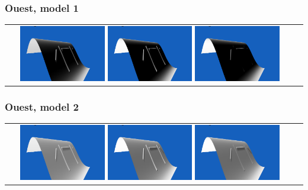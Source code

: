 \documentclass[a4paper]{article}
\begin{document}
\subsubsection{Ouest, model 1}
\begin{tabular}{cc}
\includegraphics[width=0.3\textwidth]{Images/Essais/Essai_8_phong_West_0.png}
\includegraphics[width=0.3\textwidth]{Images/Essais/Essai_8_slint_West_0.png}
\includegraphics[width=0.3\textwidth]{Images/Essais/Essai_9_slint_West_0.png}

\end{tabular}
\subsubsection{Ouest, model 2}
\begin{tabular}{cc}
\includegraphics[width=0.3\textwidth]{Images/Essais/Essai_8_phong_West_1.png}
\includegraphics[width=0.3\textwidth]{Images/Essais/Essai_8_slint_West_1.png}
\includegraphics[width=0.3\textwidth]{Images/Essais/Essai_9_slint_West_1.png}

\end{tabular}
\end{document}
